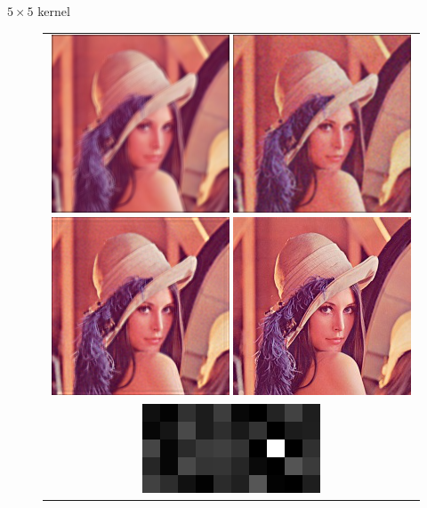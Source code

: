 \documentclass[french]{beamer}
\theoremstyle{plain}
\theoremstyle{remark}
\begin{document}
\begin{frame}{$5 \times 5$ kernel}

\begin{figure}
\begin{center}
	\begin{tabular}{c}	
		\includegraphics[scale=0.5]{images/blurred_5px.png}
		\includegraphics[scale=0.5]{images/denoised_5px.png}
		\includegraphics[scale=0.5]{images/estimation_5px.png}
		\includegraphics[scale=0.5]{images/original_5px.png}\\
		\includegraphics[scale=0.5]{images/kernels_5px.png}
	\end{tabular}
\end{center}
\end{figure}

\end{frame}
\end{document}
